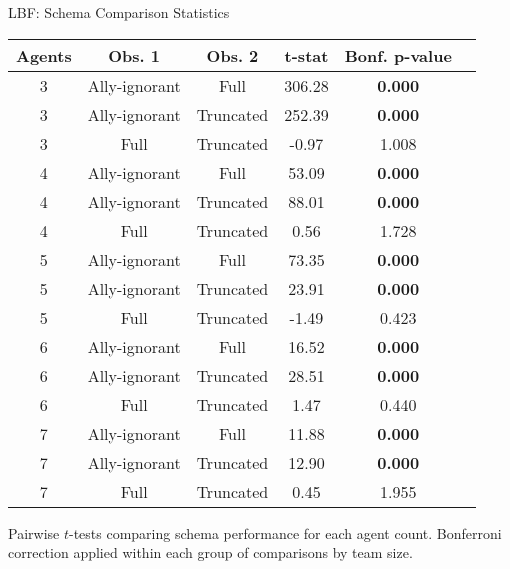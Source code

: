 \begin{frame}{LBF: Schema Comparison Statistics}
    \begin{center}
        \scriptsize
        \begin{tabular}{cccccc}
            \toprule
            \textbf{Agents} & \textbf{Obs. 1} & \textbf{Obs. 2} & \textbf{t-stat} & \textbf{Bonf. p-value} \\
            \midrule
            3 & Ally-ignorant & Full      & 306.28 & \textbf{0.000} \\
            3 & Ally-ignorant & Truncated & 252.39 & \textbf{0.000} \\
            3 & Full          & Truncated &  -0.97 & 1.008 \\
            4 & Ally-ignorant & Full      &  53.09 & \textbf{0.000} \\
            4 & Ally-ignorant & Truncated &  88.01 & \textbf{0.000} \\
            4 & Full          & Truncated &   0.56 & 1.728 \\
            5 & Ally-ignorant & Full      &  73.35 & \textbf{0.000} \\
            5 & Ally-ignorant & Truncated &  23.91 & \textbf{0.000} \\
            5 & Full          & Truncated &  -1.49 & 0.423 \\
            6 & Ally-ignorant & Full      &  16.52 & \textbf{0.000} \\
            6 & Ally-ignorant & Truncated &  28.51 & \textbf{0.000} \\
            6 & Full          & Truncated &   1.47 & 0.440 \\
            7 & Ally-ignorant & Full      &  11.88 & \textbf{0.000} \\
            7 & Ally-ignorant & Truncated &  12.90 & \textbf{0.000} \\
            7 & Full          & Truncated &   0.45 & 1.955 \\
            \bottomrule
        \end{tabular}
    \end{center}
    \vspace{0.5em}
    \centering
    \footnotesize
    Pairwise $t$-tests comparing schema performance for each agent count. 
    Bonferroni correction applied within each group of comparisons by team size.
\end{frame}

